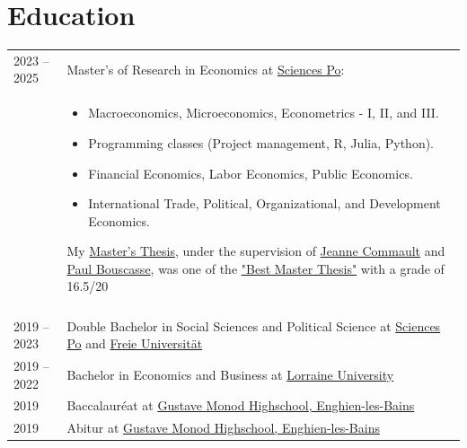 \documentclass[a4paper,12pt]{article}
\begin{document}
\section{Education}
\begin{tabularx}{\linewidth}{@{}l X@{}}	

2023 – 2025 & Master's of Research in Economics at \href{https://www.sciencespo.fr/en/}{Sciences Po}: \\
& \begin{itemize}
    \item Macroeconomics, Microeconomics, Econometrics - I, II, and III.
    \item Programming classes (Project management, R, Julia, Python).
    \item Financial Economics, Labor Economics, Public Economics.
    \item International Trade, Political, Organizational, and Development Economics.
\end{itemize}
My \href{https://www.paulogcd.com/Master_Thesis/}{Master's Thesis}, under the supervision of \href{https://www.jcommault.com}{Jeanne Commault}
and \href{https://www.paul-bouscasse.com}{Paul Bouscasse}, was one of the \href{https://www.sciencespo.fr/ecole-recherche/en/academics/masters/master-economics/best-thesis/}{"Best Master Thesis"} with a grade of 16.5/20 \\
\\
2019 – 2023 & Double Bachelor in Social Sciences and Political Science at \href{https://www.sciencespo.fr/en/}{Sciences Po} and \href{https://www.fu-berlin.de/en/index.html}{Freie Universität}\\

2019 – 2022 & Bachelor in Economics and Business at \href{https://www.univ-lorraine.fr/en/}{Lorraine University}\\

2019 & Baccalauréat at \href{https://www.lyc-polyvalent-monod-enghien.fr/}{Gustave Monod Highschool, Enghien-les-Bains} \hfill \\

2019 & Abitur at \href{https://www.lyc-polyvalent-monod-enghien.fr/}{Gustave Monod Highschool, Enghien-les-Bains} \hfill \\

\end{tabularx}

\end{document}
